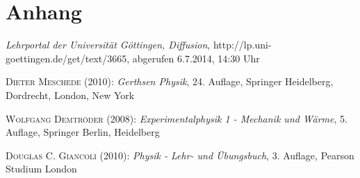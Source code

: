 \documentclass[12pt,a4paper,titlepage,headinclude,bibtotoc]{scrartcl}
\begin{document}
\section{Anhang}
\begin{thebibliography}{1000}

	\emph{Lehrportal der Universität Göttingen, Diffusion},
  http://lp.uni-goettingen.de/get/text/3665, abgerufen 6.7.2014, 14:30 Uhr

	\textsc{Dieter Meschede} (2010): \emph{Gerthsen Physik}, 24. Auflage, Springer Heidelberg,
Dordrecht, London, New York

	\textsc{Wolfgang Demtröder} (2008): \emph{Experimentalphysik 1 - Mechanik und Wärme}, 5. Auflage, Springer Berlin, Heidelberg


	\textsc{Douglas C. Giancoli} (2010): \emph{Physik - Lehr- und Übungsbuch}, 3. Auflage, Pearson Studium London
\end{thebibliography}
\end{document}
